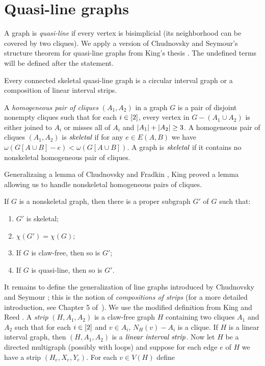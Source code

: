 \section{Quasi-line graphs}
A graph is \emph{quasi-line} if every vertex is bisimplicial (its neighborhood can be covered by two cliques).  
We apply a version of Chudnovsky and Seymour's structure theorem for quasi-line
graphs from King's thesis \cite{king2009claw}. The undefined terms
will be defined after the statement.

\begin{lem}\label{QuasilineStructure}
Every connected skeletal quasi-line graph is a circular interval graph or a composition of
linear interval strips.
\end{lem}

A \emph{homogeneous pair of cliques} $(A_1, A_2)$ in a graph $G$ is a pair of
disjoint nonempty cliques such that for each $i \in \left[2\right]$, every vertex in
$G - (A_1 \cup A_2)$ is either joined to $A_i$ or misses all of $A_i$ and
$\left|A_1\right| + \left|A_2\right| \geq 3$. A homogeneous pair of cliques $(A_1, A_2)$ is $\emph{skeletal}$
if for any $e \in E(A, B)$ we have $\omega(G[A \cup B] - e) < \omega(G[A \cup
B])$.  A graph is $\emph{skeletal}$ if it contains no nonskeletal homogeneous
pair of cliques.

Generalizaing a lemma of Chudnovsky and Fradkin \cite{chudnovskyFradkin}, King
proved a lemma allowing us to handle nonskeletal homogeneous pairs
of cliques.

\begin{lem}\label{NoHomogeneous} If $G$ is a
nonskeletal graph, then there is a proper subgraph $G'$ of $G$ such that:
\begin{enumerate}
  \item $G'$ is skeletal;
  \item $\chi(G') = \chi(G)$;
  \item If $G$ is claw-free, then so is $G'$;
  \item If $G$ is quasi-line, then so is $G'$.
\end{enumerate}
\end{lem}

It remains to define the generalization of line graphs introduced by Chudnovsky
and Seymour \cite{chudnovsky2005structure}; this is the notion of
\emph{compositions of strips} (for a more detailed introduction, see Chapter 5
of~\cite{king2009claw}). We use the modified definition from King and
Reed \cite{king2008bounding}. A \emph{strip} $(H, A_1, A_2)$ is a claw-free
graph $H$ containing two cliques $A_1$ and $A_2$ such that for each $i \in \left[2\right]$ and $v \in A_i$, $N_H(v) - A_i$ is a clique.  
If $H$ is a linear interval graph, then $(H, A_1, A_2)$ is a $\emph{linear
interval strip}$.  Now let $H$ be a directed multigraph (possibly with loops)
and suppose for each edge $e$ of $H$ we have a strip $(H_e, X_e, Y_e)$.  For
each $v \in V(H)$ define

